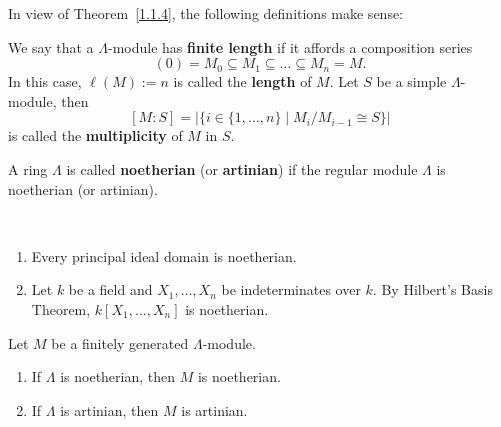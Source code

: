 
In view of Theorem~\ref{1.1.4}, the following definitions make sense:


\begin{definition}
We say that a $\Lambda$-module has \textbf{finite length} if it affords a composition series
\[
(0)=M_0\subseteq M_1\subseteq \dots \subseteq M_n = M.
\]
In this case, $\ell(M):=n$ is called the \textbf{length} of $M$. Let $S$ be a simple $\Lambda$-module, then
\[
[M:S] = |\{i\in \{1,\dots,n\}\mid M_i/M_{i-1}\cong S\}|
\]
is called the \textbf{multiplicity} of $M$ in $S$.
\end{definition}


\begin{definition}
A ring $\Lambda$ is called \textbf{noetherian} (or \textbf{artinian}) if the regular module $\Lambda$ is noetherian (or artinian).
\end{definition}


\begin{example}\
\begin{enumerate}
\item Every principal ideal domain is noetherian. 
\item Let $k$ be a field and $X_1,\dots,X_n$ be indeterminates over $k$. By Hilbert's Basis Theorem, $k[X_1,\dots,X_n]$ is noetherian.
\end{enumerate}
\end{example}


\begin{lemma}\label{1.1.5}
Let $M$ be a finitely generated $\Lambda$-module.
\begin{enumerate}
\item If $\Lambda$ is noetherian, then $M$ is noetherian.
\item If $\Lambda$ is artinian, then $M$ is artinian.
\end{enumerate}
\end{lemma}

